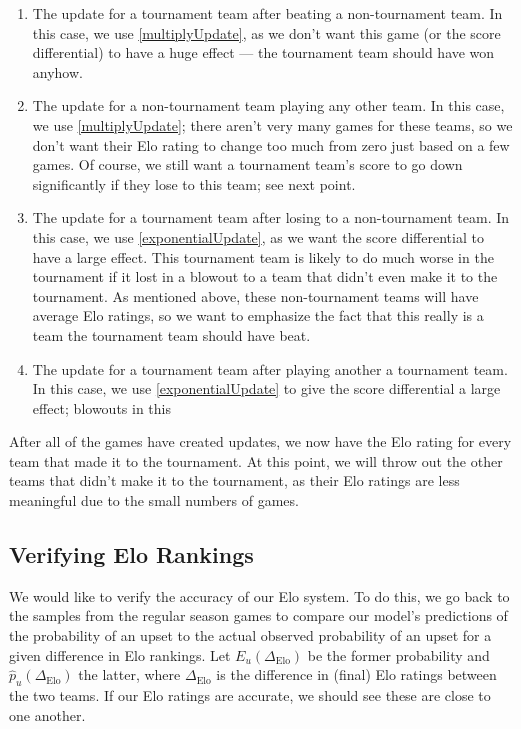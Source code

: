 \documentclass{article}
\begin{document}
\begin{enumerate}
    \item The update for a tournament team after beating a non-tournament team. In this case, we use \autoref{multiplyUpdate}, as we don't want this game (or the score differential) to have a huge effect --- the tournament team should have won anyhow.
    \item The update for a non-tournament team playing any other team. In this case, we use \autoref{multiplyUpdate}; there aren't very many games for these teams, so we don't want their Elo rating to change too much from zero just based on a few games. Of course, we still want a tournament team's score to go down significantly if they lose to this team; see next point.
    \item The update for a tournament team after losing to a non-tournament team. In this case, we use \autoref{exponentialUpdate}, as we want the score differential to have a large effect. This tournament team is likely to do much worse in the tournament if it lost in a blowout to a team that didn't even make it to the tournament. As mentioned above, these non-tournament teams will have average Elo ratings, so we want to emphasize the fact that this really is a team the tournament team should have beat.
    \item The update for a tournament team after playing another a tournament team. In this case, we use \autoref{exponentialUpdate} to give the score differential a large effect; blowouts in this 
\end{enumerate}

After all of the games have created updates, we now have the Elo rating for every team that made it to the tournament. At this point, we will throw out the other teams that didn't make it to the tournament, as their Elo ratings are less meaningful due to the small numbers of games.

\subsection{Verifying Elo Rankings}\label{verify}
We would like to verify the accuracy of our Elo system. To do this, we go back to the samples from the regular season games to compare our model's predictions of the probability of an upset to the actual observed probability of an upset for a given difference in Elo rankings. Let $E_u(\Delta_{\text{Elo}})$ be the former probability and $\hat{p}_u(\Delta_{\text{Elo}})$ the latter, where $\Delta_{\text{Elo}}$ is the difference in (final) Elo ratings between the two teams. If our Elo ratings are accurate, we should see these are close to one another. 
\end{document}
